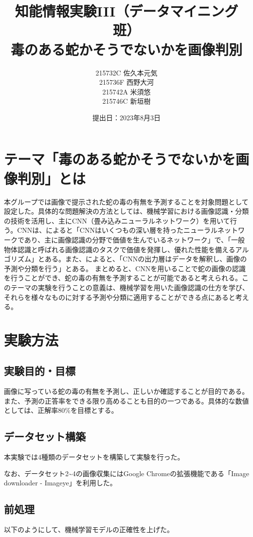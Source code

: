 \documentclass[a4paper, 11pt, titlepage]{jsarticle}
\title{知能情報実験III（データマイニング班）\\毒のある蛇かそうでないかを画像判別}
\author{215732C 佐久本元気\\215736F 西野大河\\215742A 米須悠\\215746C 新垣樹\\}
\date{提出日：2023年8月3日}
\begin{document}
\maketitle
\tableofcontents
\clearpage

\section{テーマ「毒のある蛇かそうでないかを画像判別」とは}
本グループでは画像で提示された蛇の毒の有無を予測することを対象問題として設定した。具体的な問題解決の方法としては、機械学習における画像認識・分類の技術を活用し、主にCNN（畳み込みニューラルネットワーク）を用いて行う。CNNは、\cite{theme1}によると「CNNはいくつもの深い層を持ったニューラルネットワークであり、主に画像認識の分野で価値を生んでいるネットワーク」で、「一般物体認識と呼ばれる画像認識のタスクで価値を発揮し、優れた性能を備えるアルゴリズム」とある。また、\cite{theme2}によると、「CNNの出力層はデータを解釈し、画像の予測や分類を行う」とある。
まとめると、CNNを用いることで蛇の画像の認識を行うことができ、蛇の毒の有無を予測することが可能であると考えられる。このテーマの実験を行うことの意義は、機械学習を用いた画像認識の仕方を学び、それらを様々なものに対する予測や分類に適用することができる点にあると考える。

\section{実験方法}
\subsection{実験目的・目標}
画像に写っている蛇の毒の有無を予測し、正しいか確認することが目的である。また、予測の正答率をできる限り高めることも目的の一つである。具体的な数値としては、正解率80\%を目標とする。

\subsection{データセット構築}
本実験では4種類のデータセットを構築して実験を行った。\par
なお、データセット2\textasciitilde4の画像収集にはGoogle Chromeの拡張機能である「Image downloader - Imageye」を利用した。\par

\subsection{前処理}
以下のようにして、機械学習モデルの正確性を上げた。
\end{document}
